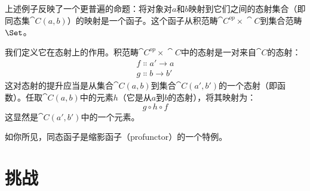 上述例子反映了一个更普遍的命题：将对象对$a$和$b$映射到它们之间的态射集合（即同态集$\cat{C}(a, b)$）的映射是一个函子。这个函子从积范畴$\cat{C}^\mathit{op}\times{}\cat{C}$到集合范畴$\Set$。

我们定义它在态射上的作用。积范畴$\cat{C}^\mathit{op}\times{}\cat{C}$中的态射是一对来自$\cat{C}$的态射：
\begin{gather*}
  f \Colon a' \to a \\
  g \Colon b \to b'
\end{gather*}
这对态射的提升应当是从集合$\cat{C}(a, b)$到集合$\cat{C}(a', b')$的一个态射（即函数）。任取$\cat{C}(a, b)$中的元素$h$（它是从$a$到$b$的态射），将其映射为：
$$g \circ h \circ f$$
这显然是$\cat{C}(a', b')$中的一个元素。

如你所见，同态函子是缩影函子（profunctor）的一个特例。

\section{挑战}

